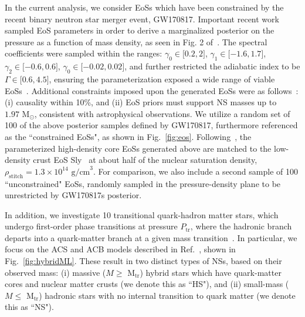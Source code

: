 \documentclass[prd,twocolumn,nofootinbib,superscriptaddress,amsmath,amssymb]{revtex4-1}
\begin{document}
In the current analysis, we consider EoSs which have been constrained by the recent binary neutron star merger event, GW170817.
Important recent work~\cite{LIGO:posterior} sampled EoS parameters in order to derive a marginalized posterior on the pressure as a function of mass density, as seen in Fig. 2 of~\cite{LIGO:posterior}.
The spectral coefficients were sampled within the ranges: $\gamma_0 \in \lbrack 0.2,2 \rbrack$, $\gamma_1 \in \lbrack -1.6,1.7 \rbrack$, $\gamma_2 \in \lbrack -0.6,0.6 \rbrack$, $\gamma_0 \in \lbrack -0.02,0.02 \rbrack$, and further restricted the adiabatic index to be $\Gamma \in \lbrack 0.6,4.5 \rbrack$, ensuring the parameterization exposed a wide range of viable EoSs~\cite{Lindblom:parameters}.
Additional constraints imposed upon the generated EoSs were as follows~\cite{LIGO:posterior}: (i) causality within 10\%, and (ii) EoS priors must support NS masses up to $1.97 \text{ M}_{\odot}$, consistent with astrophysical observations.
We utilize a random set of 100 of the above posterior samples defined by GW170817, furthermore referenced as the ``constrained EoSs", as shown in Fig.~\ref{fig:eos}.
Following~\cite{Read2009}, the parameterized high-density core EoSs generated above are matched to the low-density crust EoS Sly~\cite{Douchin:2001sv} at about half of the nuclear saturation density, $\rho_{\text{stitch}}=1.3 \times 10^{14} \text{ g/cm}^3$.
For comparison, we also include a second sample of 100 ``unconstrained" EoSs, randomly sampled in the pressure-density plane to be unrestricted by GW170817s posterior.

In addition, we investigate 10 transitional quark-hadron matter stars, which undergo first-order phase transitions at pressure $P_{\text{tr}}$, where the hadronic branch departs into a quark-matter branch at a given mass transition~\cite{Paschalidis2018,Alford:2017qgh,1971SvA....15..347S,Zdunik:2012dj,Alford:2013aca}.
In particular, we focus on the ACS and ACB models described in Ref.~\cite{Paschalidis2018}, shown in Fig.~\ref{fig:hybridML}.
These result in two distinct types of NSs, based on their observed mass: (i) massive ($M \geq \text{ M}_{\text{tr}}$) hybrid stars which have quark-matter cores and nuclear matter crusts (we denote this as ``HS"), and (ii) small-mass ($M \leq \text{ M}_{\text{tr}}$) hadronic stars with no internal transition to quark matter (we denote this as ``NS").
\end{document}
